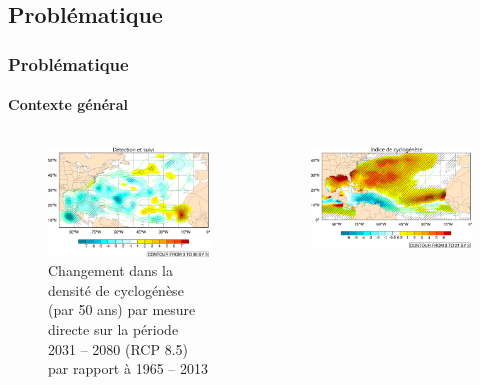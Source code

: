 \documentclass[aspectratio=169, usepdftitle=false, xcolor={dvipsnames}, 9pt,table]{beamer}
\begin{document}
\subsection{Problématique}
\begin{frame}[t]
    \frametitle{Problématique}
    \framesubtitle{Contexte général}
    \vspace{-1em}
    \begin{columns}[b]
        \begin{column}{0.5\textwidth}
            \begin{figure}[h]
                \centering
                \includegraphics[width=\textwidth]{Figures/density_fitted_title.png}
                \caption{Changement dans la densité de cyclogénèse (par 50 ans) par mesure \alert{directe} sur la période 2031 -- 2080 (RCP 8.5) par rapport à 1965 -- 2013
                \parencite{chauvin_future_2020}}
            \end{figure}
        \end{column}
        \begin{column}{0.5\textwidth}
            \begin{figure}[h]
                \centering
                \includegraphics[width=\textwidth]{Figures/gpi_fitted_2_good_title.png}

\end{figure}
\end{column}
\end{columns}
\end{frame}
\end{document}
